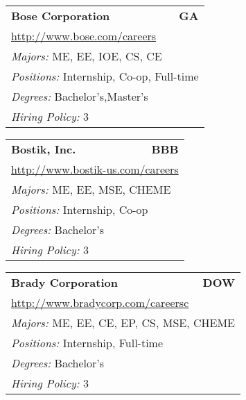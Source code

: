 \documentclass[twoside]{article}
\begin{document}
\begin{center}
\begin{multicols}{3}
\begin{FlushLeft}
\begin{minipage}{\columnwidth}
\end{minipage}
 
\begin{minipage}{\columnwidth}\begin{tabularx}{.95\columnwidth}{Xr}
                 {\Large\bf Bose Corporation} & {\Large\bf GA}\\
    \multicolumn{2}{p{.95\columnwidth}}{\url{http://www.bose.com/careers}}\\
    \multicolumn{2}{p{.95\columnwidth}}{\emph{Majors:} ME, EE, IOE, CS, CE}\\
    \multicolumn{2}{p{.95\columnwidth}}{\emph{Positions:} Internship, Co-op, Full-time}\\
    \multicolumn{2}{p{.95\columnwidth}}{\emph{Degrees:} Bachelor's,Master's}\\
    \multicolumn{2}{p{.95\columnwidth}}{\emph{Hiring Policy:} 3}\\
    \end{tabularx}
    
\end{minipage}
 
\begin{minipage}{\columnwidth}\begin{tabularx}{.95\columnwidth}{Xr}
                 {\Large\bf Bostik, Inc.} & {\Large\bf BBB}\\
    \multicolumn{2}{p{.95\columnwidth}}{\url{http://www.bostik-us.com/careers}}\\
    \multicolumn{2}{p{.95\columnwidth}}{\emph{Majors:} ME, EE, MSE, CHEME}\\
    \multicolumn{2}{p{.95\columnwidth}}{\emph{Positions:} Internship, Co-op}\\
    \multicolumn{2}{p{.95\columnwidth}}{\emph{Degrees:} Bachelor's}\\
    \multicolumn{2}{p{.95\columnwidth}}{\emph{Hiring Policy:} 3}\\
    \end{tabularx}
    
\end{minipage}
 
\begin{minipage}{\columnwidth}\begin{tabularx}{.95\columnwidth}{Xr}
                 {\Large\bf Brady Corporation} & {\Large\bf DOW}\\
    \multicolumn{2}{p{.95\columnwidth}}{\url{http://www.bradycorp.com/careersc}}\\
    \multicolumn{2}{p{.95\columnwidth}}{\emph{Majors:} ME, EE, CE, EP, CS, MSE, CHEME}\\
    \multicolumn{2}{p{.95\columnwidth}}{\emph{Positions:} Internship, Full-time}\\
    \multicolumn{2}{p{.95\columnwidth}}{\emph{Degrees:} Bachelor's}\\
    \multicolumn{2}{p{.95\columnwidth}}{\emph{Hiring Policy:} 3}\\
    \end{tabularx}
    

\end{minipage}
\end{FlushLeft}
\end{multicols}
\end{center}
\end{document}
